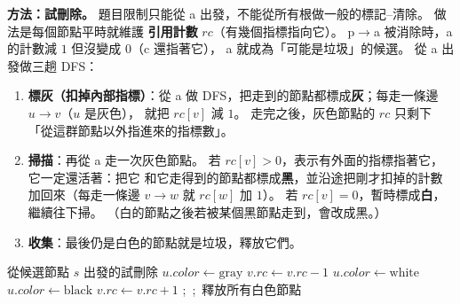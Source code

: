 \begin{pastsoln}
\textbf{方法：試刪除。} 題目限制只能從 a 出發，不能從所有根做一般的標記--清除。 做法是每個節點平時就維護
\textbf{引用計數} $\mathit{rc}$（有幾個指標指向它）。 p$\to$a 被消除時，a 的計數減 $1$ 但沒變成 $0$（c 還指著它），
a 就成為「可能是垃圾」的候選。 從 a 出發做三趟 DFS：
\begin{enumerate}
\item \textbf{標灰（扣掉內部指標）}：從 a 做 DFS，把走到的節點都標成\textbf{灰}；每走一條邊 $u \to v$（$u$ 是灰色），
就把 $\mathit{rc}[v]$ 減 $1$。 走完之後，灰色節點的 $\mathit{rc}$ 只剩下「從這群節點以外指進來的指標數」。
\item \textbf{掃描}：再從 a 走一次灰色節點。 若 $\mathit{rc}[v] > 0$，表示有外面的指標指著它，它一定還活著：把它
和它走得到的節點都標成\textbf{黑}，並沿途把剛才扣掉的計數加回來（每走一條邊 $v \to w$ 就 $\mathit{rc}[w]$ 加 $1$）。
若 $\mathit{rc}[v] = 0$，暫時標成\textbf{白}，繼續往下掃。 （白的節點之後若被某個黑節點走到，會改成黑。）
\item \textbf{收集}：最後仍是白色的節點就是垃圾，釋放它們。
\end{enumerate}
\begin{pseudo}{從候選節點 $s$ 出發的試刪除}
        \State $u.\mathit{color} \gets \text{gray}$
            \State $v.\mathit{rc} \gets v.\mathit{rc} - 1$
            \State {}
        \EndFor
    \EndIf
\EndProcedure
{}
            \State {}
        \Else
            \State $u.\mathit{color} \gets \text{white}$
             \State {} \EndFor
        \EndIf
    \EndIf
\EndProcedure
{}
    \State $u.\mathit{color} \gets \text{black}$
        \State $v.\mathit{rc} \gets v.\mathit{rc} + 1$
         \State {} \EndIf
    \EndFor
\EndProcedure
\Statex
\State {};\ ;\ 釋放所有白色節點
\end{pseudo}


\end{pastsoln}
